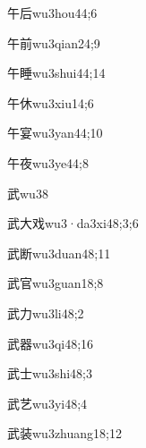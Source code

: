 \begin{verbete}{午后}{wu3hou4}{4;6}
\end{verbete}
\begin{verbete}{午前}{wu3qian2}{4;9}
\end{verbete}
\begin{verbete}{午睡}{wu3shui4}{4;14}
\end{verbete}
\begin{verbete}{午休}{wu3xiu1}{4;6}
\end{verbete}
\begin{verbete}{午宴}{wu3yan4}{4;10}
\end{verbete}
\begin{verbete}{午夜}{wu3ye4}{4;8}
\end{verbete}
\begin{verbete}{武}{wu3}{8}
\end{verbete}
\begin{verbete}{武大戏}{wu3·da3xi4}{8;3;6}
\end{verbete}
\begin{verbete}{武断}{wu3duan4}{8;11}
\end{verbete}
\begin{verbete}{武官}{wu3guan1}{8;8}
\end{verbete}
\begin{verbete}{武力}{wu3li4}{8;2}
\end{verbete}
\begin{verbete}{武器}{wu3qi4}{8;16}
\end{verbete}
\begin{verbete}{武士}{wu3shi4}{8;3}
\end{verbete}
\begin{verbete}{武艺}{wu3yi4}{8;4}
\end{verbete}
\begin{verbete}{武装}{wu3zhuang1}{8;12}
\end{verbete}
